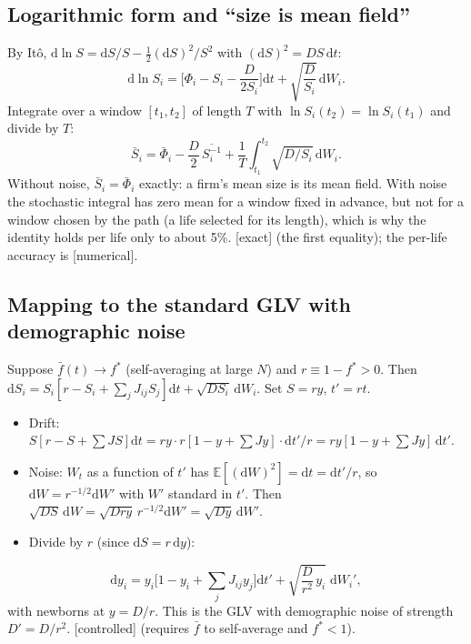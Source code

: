 \documentclass[11pt]{article}
\newcommand{\E}{\mathbb E}
\newcommand{\Sb}{\bar S}
\newcommand{\fb}{\bar f}
\newcommand{\dd}{\mathrm d}
\newcommand{\exact}{\textsf{\small[exact]}}
\newcommand{\controlled}{\textsf{\small[controlled]}}
\newcommand{\numer}{\textsf{\small[numerical]}}
\begin{document}
\subsection{Logarithmic form and ``size is mean field''}

By It\^o, $\dd\ln S=\dd S/S-\tfrac12(\dd S)^2/S^2$ with $(\dd S)^2=DS\,\dd t$:
\begin{equation}
\dd\ln S_i=\Big[\Phi_i-S_i-\frac{D}{2S_i}\Big]\dd t+\sqrt{\frac{D}{S_i}}\,\dd W_i .
\label{eq:log}
\end{equation}
Integrate over a window $[t_1,t_2]$ of length $T$ with $\ln S_i(t_2)=\ln S_i(t_1)$ and divide by $T$:
\begin{equation}
\Sb_i=\bar\Phi_i-\frac D2\,\overline{S_i^{-1}}+\frac1T\int_{t_1}^{t_2}\sqrt{D/S_i}\,\dd W_i .
\end{equation}
Without noise, $\Sb_i=\bar\Phi_i$ exactly: a firm's mean size is its mean field.  With noise the
stochastic integral has zero mean for a window fixed in advance, but not for a window chosen by the path
(a life selected for its length), which is why the identity holds per life only to about 5\%.  \exact{}
(the first equality); the per-life accuracy is \numer.

\subsection{Mapping to the standard GLV with demographic noise}

Suppose $\fb(t)\to f^*$ (self-averaging at large $N$) and $r\equiv1-f^*>0$.  Then
$\dd S_i=S_i[r-S_i+\sum_jJ_{ij}S_j]\dd t+\sqrt{DS_i}\,\dd W_i$.  Set $S=ry$, $t'=rt$.
\begin{itemize}
\item Drift: $S[r-S+\sum JS]\dd t=ry\cdot r[1-y+\sum Jy]\cdot\dd t'/r=ry[1-y+\sum Jy]\,\dd t'$.
\item Noise: $W_t$ as a function of $t'$ has $\E[(\dd W)^2]=\dd t=\dd t'/r$, so $\dd W=r^{-1/2}\dd W'$ with $W'$
  standard in $t'$.  Then $\sqrt{DS}\,\dd W=\sqrt{Dry}\,r^{-1/2}\dd W'=\sqrt{Dy}\,\dd W'$.
\item Divide by $r$ (since $\dd S=r\,\dd y$):
\end{itemize}
\begin{equation}
\dd y_i=y_i\Big[1-y_i+\sum_jJ_{ij}y_j\Big]\dd t'+\sqrt{\frac{D}{r^2}\,y_i}\;\dd W_i' ,
\end{equation}
with newborns at $y=D/r$.  This is the GLV with demographic noise of strength $D'=D/r^2$.
\controlled{} (requires $\fb$ to self-average and $f^*<1$).
\end{document}
